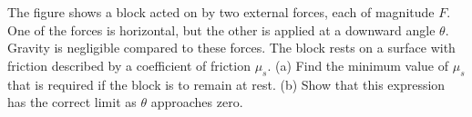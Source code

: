 The figure shows a block acted on by two external forces, each of magnitude $F$.
One of the forces is horizontal, but the other is applied at a downward angle $\theta$.
Gravity is negligible compared to these forces. The block rests on a
surface with friction described by a coefficient of friction $\mu_s$.
(a) Find the minimum value of $\mu_s$ that is required if the block is to remain
at rest.\answercheck\hwendpart
(b) Show that this expression has the correct limit as $\theta$ approaches zero.

